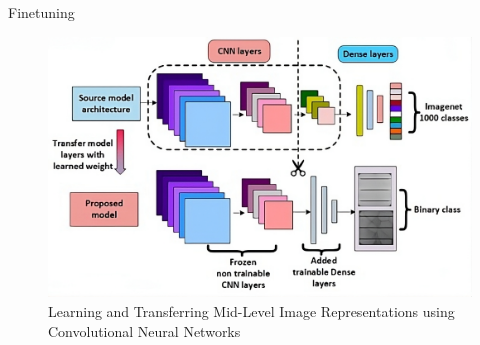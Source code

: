 \begin{frame}{Finetuning}
    \begin{figure}
    \centering
    \includegraphics[width=1.0\textwidth,height=1.0\textheight,keepaspectratio]{images/Finetuning_fig.png}
    \caption{Learning and Transferring Mid-Level Image Representations using Convolutional Neural Networks }
    \end{figure}
\end{frame} 
